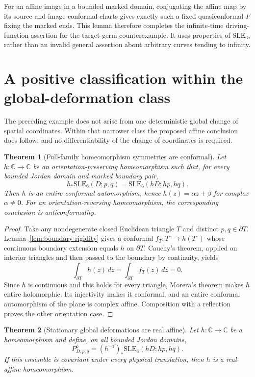 \documentclass[11pt]{article}
\newtheorem{theorem}{Theorem}[section]
\theoremstyle{definition}\newtheorem{definition}[theorem]{Definition}
\theoremstyle{remark}\newtheorem{remark}[theorem]{Remark}
\newcommand{\SLE}{\mathrm{SLE}_6}
\newcommand{\CC}{\mathbb C}
\begin{document}
For an affine image in a bounded marked domain, conjugating the affine map
by its source and image conformal charts gives exactly such a fixed
quasiconformal $F$ fixing the marked ends.  This lemma therefore completes
the infinite-time driving-function assertion for the target-germ
counterexample.  It uses properties of SLE$_6$, rather than an invalid
general assertion about arbitrary curves tending to infinity.

\section{A positive classification within the global-deformation class}
\label{sec:global-rigidity}

The preceding example does not arise from one deterministic global change
of spatial coordinates. Within that narrower class the proposed affine
conclusion does follow, and no differentiability of the change of
coordinates is required.

\begin{theorem}[Full-family homeomorphism symmetries are conformal]
\label{thm:homeo-symmetry}
Let $h:\CC\to\CC$ be an orientation-preserving homeomorphism such that,
for every bounded Jordan domain and marked boundary pair,
\[
 h_*\SLE(D;p,q)=\SLE(hD;hp,hq).
\]
Then $h$ is an entire conformal automorphism, hence $h(z)=\alpha z+\beta$
for complex $\alpha\ne0$. For an orientation-reversing homeomorphism,
the corresponding conclusion is anticonformality.
\end{theorem}

\begin{proof}
Take any nondegenerate closed Euclidean triangle $T$ and distinct
$p,q\in\partial T$. Lemma~\ref{lem:boundary-rigidity} gives a conformal
$f_T:T^\circ\to h(T^\circ)$ whose continuous boundary extension equals
$h$ on $\partial T$. Cauchy's theorem, applied on interior triangles
and then passed to the boundary by continuity, yields
\[
 \int_{\partial T}h(z)\,dz=\int_{\partial T}f_T(z)\,dz=0.
\]
Since $h$ is continuous and this holds for every triangle, Morera's
theorem makes $h$ entire holomorphic. Its injectivity makes it conformal,
and an entire conformal automorphism of the plane is complex affine.
Composition with a reflection proves the other orientation case.
\end{proof}

\begin{theorem}[Stationary global deformations are real affine]
\label{thm:stationary-deformation}
Let $h:\CC\to\CC$ be a homeomorphism and define, on all bounded Jordan
domains,
\[
 P^h_{D,p,q}=(h^{-1})_*\SLE(hD;hp,hq).
\]
If this ensemble is covariant under every physical translation, then
$h$ is a real-affine homeomorphism.
\end{theorem}
\end{document}
